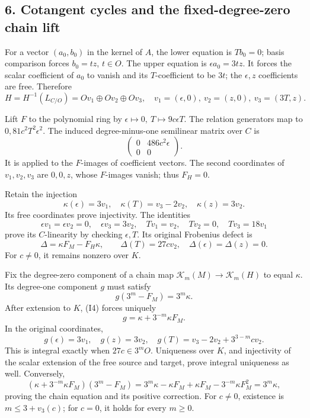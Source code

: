 \documentclass[
  10pt,
]{article}
\begin{document}
\subsection{6. Cotangent cycles and the fixed-degree-zero chain
lift}\label{cotangent-cycles-and-the-fixed-degree-zero-chain-lift}

For a vector \((a_0,b_0)\) in the kernel of \(A\), the lower equation is
\(Tb_0=0\); basis comparison forces \(b_0=t z\), \(t\in O\). The upper
equation is \(\epsilon a_0=3tz\). It forces the scalar coefficient of
\(a_0\) to vanish and its \(T\)-coefficient to be \(3t\); the
\(\epsilon,z\) coefficients are free. Therefore \[
H=H^{-1}(L_{C/O})=Ov_1\oplus Ov_2\oplus Ov_3,\quad
v_1=(\epsilon,0),\ v_2=(z,0),\ v_3=(3T,z). \tag{I15}
\]

Lift \(F\) to the polynomial ring by
\(\epsilon\mapsto0,\ T\mapsto9c\epsilon T\). The relation generators map
to \(0,81c^2T^2\epsilon^2\). The induced degree-minus-one semilinear
matrix over \(C\) is \[
\begin{pmatrix}0&486c^2\epsilon\\0&0\end{pmatrix}.
\] It is applied to the \(F\)-images of coefficient vectors. The second
coordinates of \(v_1,v_2,v_3\) are \(0,0,z\), whose \(F\)-images vanish;
thus \(F_H=0\).

Retain the injection \[
\kappa(\epsilon)=3v_1,\quad
\kappa(T)=v_3-2v_2,\quad\kappa(z)=3v_2. \tag{I16}
\] Its free coordinates prove injectivity. The identities \[
\epsilon v_1=\epsilon v_2=0,\quad\epsilon v_3=3v_2,\quad
Tv_1=v_2,\quad Tv_2=0,\quad Tv_3=18v_1
\] prove its \(C\)-linearity by checking \(\epsilon,T\). Its original
Frobenius defect is \[
\Delta=\kappa F_M-F_H\kappa,\qquad
\Delta(T)=27cv_2,\quad\Delta(\epsilon)=\Delta(z)=0. \tag{I17}
\] For \(c\ne0\), it remains nonzero over \(K\).

Fix the degree-zero component of a chain map
\(\mathcal K_m(M)\to\mathcal K_m(H)\) to equal \(\kappa\). Its
degree-one component \(g\) must satisfy \[
g(3^m-F_M)=3^m\kappa. \tag{I18}
\] After extension to \(K\), (I4) forces uniquely \[
g=\kappa+3^{-m}\kappa F_M. \tag{I19}
\] In the original coordinates, \[
g(\epsilon)=3v_1,\quad g(z)=3v_2,\quad
g(T)=v_3-2v_2+3^{3-m}cv_2.
\] This is integral exactly when \(27c\in3^mO\). Uniqueness over \(K\),
and injectivity of the scalar extension of the free source and target,
prove integral uniqueness as well. Conversely, \[
(\kappa+3^{-m}\kappa F_M)(3^m-F_M)
=3^m\kappa-\kappa F_M+\kappa F_M-3^{-m}\kappa F_M^2
=3^m\kappa,
\] proving the chain equation and its positive correction. For
\(c\ne0\), existence is \(m\le3+v_3(c)\); for \(c=0\), it holds for
every \(m\ge0\).
\end{document}

